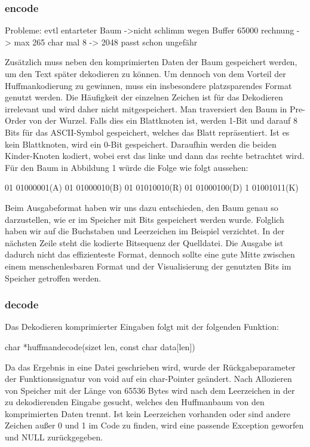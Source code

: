 \documentclass[course=erap]{aspdoc}
\begin{document}
\subsubsection{encode}

Probleme: evtl entarteter Baum ->nicht schlimm wegen Buffer 65000 rechnung -> max 265 char mal 8 -> 2048 passt schon ungefähr

Zusätzlich muss neben den komprimierten Daten der Baum gespeichert werden, um den Text später dekodieren zu können. Um dennoch von dem Vorteil der Huffmankodierung zu gewinnen, muss ein insbesondere platzsparendes Format genutzt werden. Die Häufigkeit der einzelnen Zeichen ist für das Dekodieren irrelevant und wird daher nicht mitgespeichert.
Man traversiert den Baum in Pre-Order von der Wurzel. Falls dies ein Blattknoten ist, werden 1-Bit und darauf 8 Bits für das ASCII-Symbol gespeichert, welches das Blatt repräsentiert. Ist es kein Blattknoten, wird ein 0-Bit gespeichert. Daraufhin werden die beiden Kinder-Knoten kodiert, wobei erst das linke und dann das rechte betrachtet wird.
Für den Baum in Abbildung 1 würde die Folge wie folgt aussehen:

\begin{center}
    01 01000001(A) 01 01000010(B) 01 01010010(R) 01 01000100(D) 1 01001011(K)
\end{center}

Beim Ausgabeformat haben wir uns dazu entschieden, den Baum genau so darzustellen, wie er im Speicher mit Bits gespeichert werden wurde. Folglich haben wir auf die Buchstaben und Leerzeichen im Beispiel verzichtet. In der nächsten Zeile steht die kodierte Bitsequenz der Quelldatei. Die Ausgabe ist dadurch nicht das effizienteste Format, dennoch sollte eine gute Mitte zwischen einem menschenlesbaren Format und der Visualisierung der genutzten Bits im Speicher getroffen werden.

\subsubsection{decode}

Das Dekodieren komprimierter Eingaben folgt mit der folgenden Funktion:
\begin{center}
    char *huffman\textunderscore decode(size\textunderscore t len, const char data[len])
\end{center}
Da das Ergebnis in eine Datei geschrieben wird, wurde der Rückgabeparameter der Funktionssignatur von void auf ein char-Pointer geändert. Nach Allozieren von Speicher mit der Länge von 65536 Bytes wird nach dem Leerzeichen in der zu dekodierenden Eingabe gesucht, welches den Huffmanbaum von den komprimierten Daten trennt. Ist kein Leerzeichen vorhanden oder sind andere Zeichen außer 0 und 1 im Code zu finden, wird eine passende Exception geworfen und NULL zurückgegeben.\\
\end{document}
